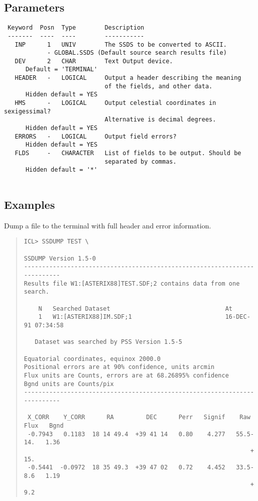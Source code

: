 \documentclass{book}
\renewcommand{\_}{{\tt\char'137}}     %
\begin{document}
\subsection{Parameters}
\begin{verbatim}
 Keyword  Posn  Type        Description
 -------  ----  ----        -----------
   INP      1   UNIV        The SSDS to be converted to ASCII.
            - GLOBAL.SSDS (Default source search results file)
   DEV      2   CHAR        Text Output device.
      Default = 'TERMINAL'
   HEADER   -   LOGICAL     Output a header describing the meaning
                            of the fields, and other data.
      Hidden default = YES
   HMS      -   LOGICAL     Output celestial coordinates in sexigessimal?
                            Alternative is decimal degrees.
      Hidden default = YES
   ERRORS   -   LOGICAL     Output field errors?
      Hidden default = YES
   FLDS     -   CHARACTER   List of fields to be output. Should be
                            separated by commas.
      Hidden default = '*'
 
\end{verbatim}\subsection{Examples}
Dump a file to the terminal with full header and error information.
\begin{quote}\begin{verbatim}
ICL> SSDUMP TEST \
 
SSDUMP Version 1.5-0
--------------------------------------------------------------------------
Results file W1:[ASTERIX88]TEST.SDF;2 contains data from one search.
 
    N   Searched Dataset                                At
    1   W1:[ASTERIX88]IM.SDF;1                          16-DEC-91 07:34:58
 
   Dataset was searched by PSS Version 1.5-5
 
Equatorial coordinates, equinox 2000.0
Positional errors are at 90% confidence, units arcmin
Flux units are Counts, errors are at 68.26895% confidence
Bgnd units are Counts/pix
--------------------------------------------------------------------------
 
 X_CORR    Y_CORR      RA         DEC      Perr   Signif    Raw Flux   Bgnd
 -0.7943   0.1183  18 14 49.4  +39 41 14   0.80    4.277   55.5- 14.   1.36
                                                               + 15.
 -0.5441  -0.0972  18 35 49.3  +39 47 02   0.72    4.452   33.5- 8.6   1.19
                                                               + 9.2
\end{verbatim}\end{quote}
\end{document}
